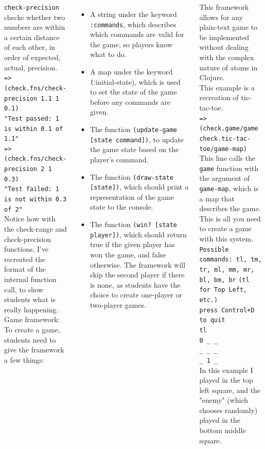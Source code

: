 \documentclass[17pt, a0paper, landscape,  margin=0mm, innermargin=10mm, blockverticalspace=3mm, colspace=3mm, subcolspace=3mm]{tikzposter}
\begin{document}
\begin{columns}
{\texttt{check-precision} checks whether two numbers are within a certain distance of each other, in order of expected, actual, precision. \\
\texttt{=> (check.fns/check-precision 1.1 1 0.1)} \\
\texttt{"Test passed: 1 is within 0.1 of 1.1"} \\
\texttt{=> (check.fns/check-precision 2 1 0.3)} \\
\texttt{"Test failed: 1 is not within 0.3 of 2"} \\
Notice how with the check-range and check-precision functions, I've recreated the format of the internal function call, to show students what is really happening. \\

    Game framework: \\
    To create a game, students need to give the framework a few things:
    \begin{itemize}
    \item A string under the keyword \texttt{:commands}, which describes which commands are valid for the game, so players know what to do.
    \item A map under the keyword \texttt(:initial-state), which is used to set the state of the game before any commands are given.
    \item The function \texttt{(update-game [state command])}, to update the game state based on the player's command.
    \item The function \texttt{(draw-state [state])}, which should print a representation of the game state to the console.
    \item The function \texttt{(win? [state player])}, which should return true if the given player has won the game, and false otherwise. The framework will skip the second player if there is none, as students have the choice to create one-player or two-player games.
    \end{itemize}
    This framework allows for any plain-text game to be implemented without dealing with the complex nature of atoms in Clojure. \\

    This example is a recreation of tic-tac-toe. \\
    \texttt{=> (check.game/game check.tic-tac-toe/game-map)} \\
    This line calls the \texttt{game} function with the argument of \texttt{game-map}, which is a map that describes the game. This is all you need to create a game with this system. \\
\texttt{Possible commands: tl, tm, tr, ml, mm, mr, bl, bm, br}
\texttt{(tl for Top Left, etc.)} \\
\texttt{press Control+D to quit} \\
\texttt{tl} \\
\texttt{0 \_ \_} \\
\texttt{\_ \_ \_ } \\
\texttt{\_ 1 \_ } \\
In this example I played in the top left square, and the "enemy" (which chooses randomly) played in the bottom middle square. }




\end{columns}
\end{document}
